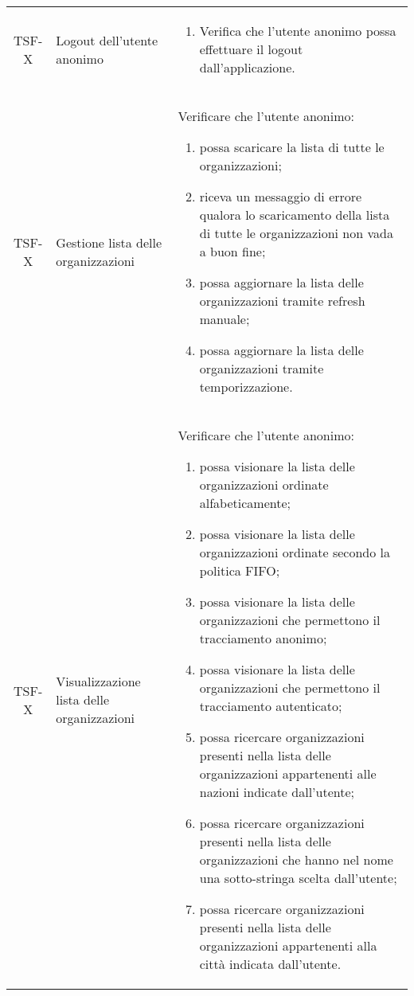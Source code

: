 {\begin{longtable}{ c | C{3cm} | C{11cm} }
TSF-X & Logout dell'utente anonimo & \begin{enumerate}
    \item Verifica che l'utente anonimo possa effettuare il logout dall'applicazione.
\end{enumerate} \\

TSF-X & Gestione lista delle organizzazioni &
Verificare che l'utente anonimo:
\begin{enumerate}
    \item possa scaricare la lista di tutte le organizzazioni;
    \item riceva un messaggio di errore qualora lo scaricamento della lista di tutte le organizzazioni non vada a buon fine;
    \item possa aggiornare la lista delle organizzazioni tramite refresh manuale;
    \item possa aggiornare la lista delle organizzazioni tramite temporizzazione.
\end{enumerate} \\

TSF-X & Visualizzazione lista delle organizzazioni & 
Verificare che l'utente anonimo:
\begin{enumerate}
    \item possa visionare la lista delle organizzazioni ordinate alfabeticamente;
    \item possa visionare la lista delle organizzazioni ordinate secondo la politica FIFO;
    \item possa visionare la lista delle organizzazioni che permettono il tracciamento anonimo;
    \item possa visionare la lista delle organizzazioni che permettono il tracciamento autenticato;
    \item possa ricercare organizzazioni presenti nella lista delle organizzazioni appartenenti alle nazioni indicate dall'utente;
    \item possa ricercare organizzazioni presenti nella lista delle organizzazioni che hanno nel nome una sotto-stringa scelta dall'utente;
    \item possa ricercare organizzazioni presenti nella lista delle organizzazioni appartenenti alla città indicata dall'utente.
\end{enumerate} \\


\end{longtable}}
